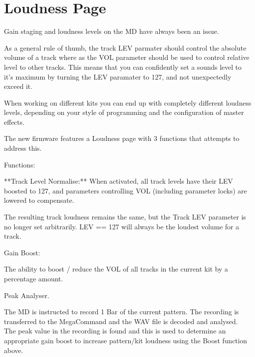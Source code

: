 \chapter{Loudness Page}
Gain staging and loudness levels on the MD have always been an issue.

As a general rule of thumb, the track LEV parmater should control the absolute volume of a track where as the VOL parameter should be used to control relative level to other tracks. This means that you can confidently set a sounds level to it's maximum by turning the LEV paramater to 127, and not unexpectedly exceed it.


When working on different kits you can end up with completely different loudness levels, depending on your style of programming and the configuration of master effects.

The new firmware features a Loudness page with 3 functions that attempts to address this.

Functions:

**Track Level Normalise:** When activated,  all track levels have their LEV boosted to 127, and parameters controlling VOL (including parameter locks) are lowered to compensate. 

The resulting track loudness remains the same, but the Track LEV parameter is no longer set arbitrarily. LEV == 127 will always be the loudest volume for a track.

Gain Boost:

The ability to boost / reduce the VOL of all tracks in the current kit by a percentage amount.

Peak Analyser.

The MD is instructed to record 1 Bar of the current pattern. The recording is transferred to the MegaCommand and the WAV file is decoded and analysed. The peak value in the recording is found and this is used to determine an appropriate gain boost to increase pattern/kit loudness using the Boost function above.